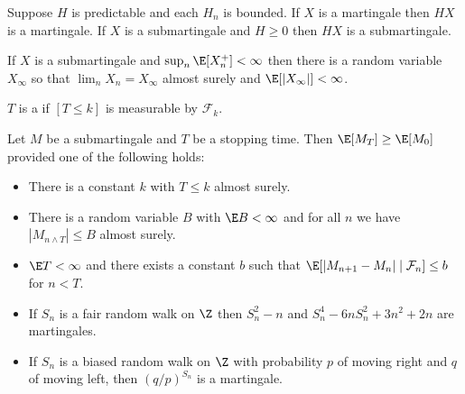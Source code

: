 \documentclass[11pt,a4paper]{article}
\newcommand*{\Fl}[0]{\mathcal{F}}
\begin{document}
\begin{lemma}
  Suppose $H$ is predictable and each $H_n$ is bounded.
  If $X$ is a martingale then $HX$ is a martingale.
  If $X$ is a submartingale and $H \ge 0$ then $HX$ is a submartingale.
\end{lemma}

\begin{theorem}
  If $X$ is a submartingale and $\sup_n \E[X_n^+] < \infty$ then there is a random variable $X_\infty$ so that $\lim_n X_n = X_\infty$ almost surely and $\E[|X_\infty|] < \infty$.
\end{theorem}

\begin{definition}
  $T$ is a  if $[T \le k]$ is measurable by $\Fl_k$.
\end{definition}

\begin{theorem}
  Let $M$ be a submartingale and $T$ be a stopping time.
  Then $\E[M_T] \ge \E[M_0]$ provided one of the following holds:
  \begin{itemize}
  \item There is a constant $k$ with $T \le k$ almost surely.
  \item There is a random variable $B$ with $\E B < \infty$ and for all $n$ we have $|M_{n \wedge T}| \le B$ almost surely.
  \item $\E T < \infty$ and there exists a constant $b$ such that $\E[|M_{n+1} - M_n| \mid \Fl_n] \le b$ for $n < T$.
  \end{itemize}
\end{theorem}

\begin{example}\hfill
  \begin{itemize}
  \item If $S_n$ is a fair random walk on $\Z$ then $S_n^2 - n$ and $S_n^4 - 6nS_n^2 + 3n^2 + 2n$ are martingales.
  \item If $S_n$ is a biased random walk on $\Z$ with probability $p$ of moving right and $q$ of moving left, then $(q/p)^{S_n}$ is a martingale.
  \end{itemize}
\end{example}

\printbibliography
\end{document}
